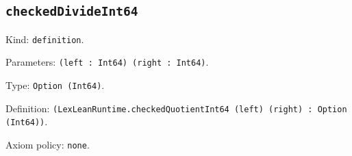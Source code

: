 \documentclass[11pt]{article}
\begin{document}
\subsection*{\texttt{checkedDivideInt64}}
\noindent Kind: \texttt{definition}.\par
\noindent Parameters: \texttt{(left : Int64) (right : Int64)}.\par
\noindent Type: \texttt{Option (Int64)}.\par
\noindent Definition: \texttt{(LexLeanRuntime.checkedQuotientInt64 (left) (right) : Option (Int64))}.\par
\noindent Axiom policy: \texttt{none}.\par
\end{document}
